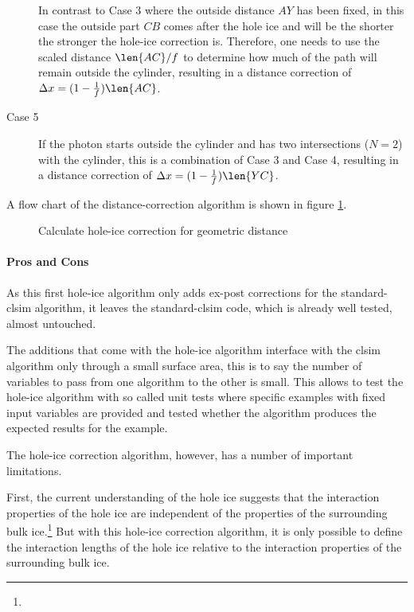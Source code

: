 \begin{description}
  In contrast to Case 3 where the outside distance $AY$ has been fixed, in this case the outside part $CB$ comes after the hole ice and will be the shorter the stronger the hole-ice correction is. Therefore, one needs to use the scaled distance $\len{AC} / f$ to determine how much of the path will remain outside the cylinder, resulting in a distance correction of $\Delta x = (1 - \frac{1}{f})\len{AC}$.
  \item[Case 5] If the photon starts outside the cylinder and has two intersections ($N = 2$) with the cylinder, this is a combination of Case 3 and Case 4, resulting in a distance correction of $\Delta x = (1 - \frac{1}{f})\len{YC}$.
\end{description}

A flow chart of the distance-correction algorithm is shown in figure \ref{fig:Eeshi4Oh}.

\begin{figure}[htbp]
  \caption{Calculate hole-ice correction for geometric distance}
  \label{fig:Eeshi4Oh}
\end{figure}

\paragraph{Pros and Cons}
As this first hole-ice algorithm only adds ex-post corrections for the standard-clsim algorithm, it leaves the standard-clsim code, which is already well tested, almost untouched.

The additions that come with the hole-ice algorithm interface with the clsim algorithm only through a small surface area, this is to say the number of variables to pass from one algorithm to the other is small. This allows to test the hole-ice algorithm with so called unit tests where specific examples with fixed input variables are provided and tested whether the algorithm produces the expected results for the example. 

The hole-ice correction algorithm, however, has a number of important limitations.

First, the current understanding of the hole ice suggests that the interaction properties of the hole ice are independent of the properties of the surrounding bulk ice.\footnote{}
  But with this hole-ice correction algorithm, it is only possible to define the interaction lengths of the hole ice relative to the interaction properties of the surrounding bulk ice.

